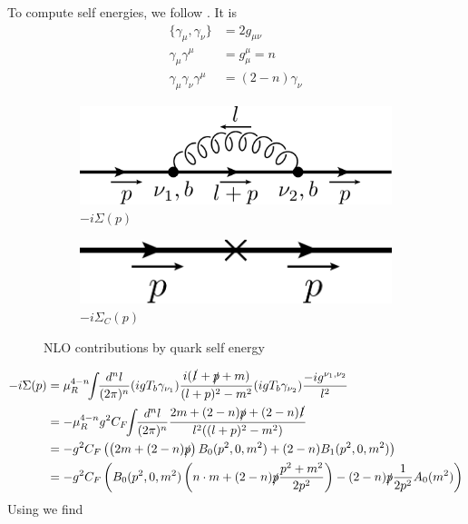To compute self energies, we follow \cite{Bojak:2000eu}.
It is
\begin{align}
\{\gamma_\mu,\gamma_\nu\} &= 2g_{\mu\nu}\\
\gamma_\mu\gamma^\mu &= g_\mu^\mu = n \\
\gamma_\mu\gamma_\nu\gamma^\mu &= (2-n)\gamma_\nu
\end{align}
\begin{figure}[ht!]
	\begin{subfigure}[t]{.4\textwidth}
		\includegraphics[width=\textwidth]{pyfeyn/nlo-v-seq}
		\caption{$-i\Sigma(p)$}
	\end{subfigure}\hspace{.15\textwidth}%
	\begin{subfigure}[t]{.4\textwidth}
		\includegraphics[width=\textwidth]{pyfeyn/nlo-v-seqc}
		\caption{$-i\Sigma_C(p)$}
	\end{subfigure}
	\caption{NLO contributions by quark self energy}\label{fig:FeynNLOvseq}
\end{figure}
\begin{align}
-i\Sigma(p) &= \mu_R^{4-n}\!\!\int\!\!\frac{d^nl}{(2\pi)^n}(igT_b \gamma_{\nu_1})\frac{i(\slashed{l}+\slashed{p}+m)}{(l+p)^2-m^2}(igT_b \gamma_{\nu_2})\frac{-ig^{\nu_1,\nu_2}}{l^2}\\
 &=-\mu_R^{4-n}g^2C_F\!\!\int\!\!\frac{d^nl}{(2\pi)^n}\frac{2m+(2-n)\slashed{p}+(2-n)\slashed{l}}{l^2((l+p)^2-m^2)}\\
 &=-g^2C_F\left(\left(2m+(2-n)\slashed{p}\right)B_0(p^2,0,m^2)+(2-n)B_1(p^2,0,m^2)\right)\\
 &=-g^2C_F\left(B_0(p^2,0,m^2)\left(n\cdot m+(2-n)\slashed{p}\frac{p^2+m^2}{2p^2}\right)-(2-n)\slashed{p}\frac 1{2p^2}A_0(m^2)\right)
\end{align}
Using \cite{Bojak:2000eu} we find
